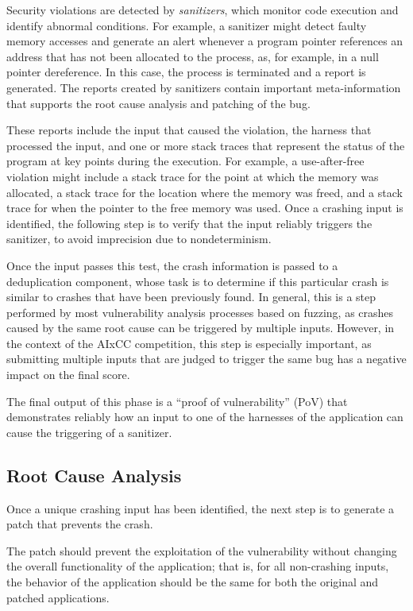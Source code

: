 Security violations are detected by \emph{sanitizers}, which monitor code execution and identify abnormal conditions.
For example, a sanitizer might detect faulty memory accesses and generate an alert whenever a program pointer references an address that has not been allocated to the process, as, for example, in a null pointer dereference.
In this case, the process is terminated and a report is generated.
The reports created by sanitizers contain important meta-information that supports the root cause analysis and patching of the bug.

These reports include the input that caused the violation, the harness that processed the input, and one or more stack traces that represent the status of the program at key points during the execution.
For example, a use-after-free violation might include a stack trace for the point at which the memory was allocated, a stack trace for the location where the memory was freed, and a stack trace for when the pointer to the free memory was used.
Once a crashing input is identified, the following step is to verify that the input reliably triggers the sanitizer, to avoid imprecision due to nondeterminism.

Once the input passes this test, the crash information is passed to a deduplication component, whose task is to determine if this particular crash is similar to crashes that have been previously found.
In general, this is a step performed by most vulnerability analysis processes based on fuzzing, as crashes caused by the same root cause can be triggered by multiple inputs.
However, in the context of the AIxCC competition, this step is especially important, as submitting multiple inputs that are judged to trigger the same bug has a negative impact on the final score.

The final output of this phase is a ``proof of vulnerability'' (PoV) that demonstrates reliably how an input to one of the harnesses of the application can cause the triggering of a sanitizer.

\subsection{Root Cause Analysis}
Once a unique crashing input has been identified, the next step is to generate a patch that prevents the crash.

The patch should prevent the exploitation of the vulnerability without changing the overall functionality of the application; that is, for all non-crashing inputs, the behavior of the application should be the same for both the original and patched applications.

